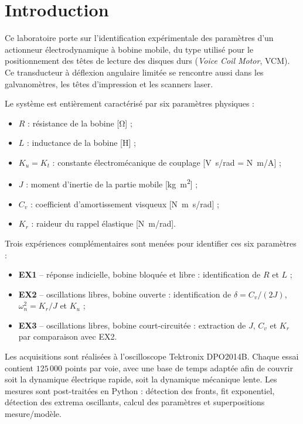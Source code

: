 \section{Introduction}

Ce laboratoire porte sur l'identification expérimentale des paramètres d'un actionneur électrodynamique à bobine mobile, du type utilisé pour le positionnement des têtes de lecture des disques durs (\emph{Voice Coil Motor}, VCM). Ce transducteur à déflexion angulaire limitée se rencontre aussi dans les galvanomètres, les têtes d'impression et les scanners laser.

Le système est entièrement caractérisé par six paramètres physiques :
\begin{itemize}
    \item \(R\) : résistance de la bobine [\si{\ohm}] ;
    \item \(L\) : inductance de la bobine [\si{H}] ;
    \item \(K_u = K_t\) : constante électromécanique de couplage [\si{V.s/rad} = \si{N.m/A}] ;
    \item \(J\) : moment d'inertie de la partie mobile [\si{kg.m^2}] ;
    \item \(C_v\) : coefficient d'amortissement visqueux [\si{N.m.s/rad}] ;
    \item \(K_r\) : raideur du rappel élastique [\si{N.m/rad}].
\end{itemize}

Trois expériences complémentaires sont menées pour identifier ces six paramètres :
\begin{itemize}
    \item \textbf{EX1} -- réponse indicielle, bobine bloquée et libre : identification de \(R\) et \(L\) ;
    \item \textbf{EX2} -- oscillations libres, bobine ouverte : identification de \(\delta = C_v/(2J)\), \(\omega_n^2 = K_r/J\) et \(K_u\) ;
    \item \textbf{EX3} -- oscillations libres, bobine court-circuitée : extraction de \(J\), \(C_v\) et \(K_r\) par comparaison avec EX2.
\end{itemize}

Les acquisitions sont réalisées à l'oscilloscope Tektronix DPO2014B. Chaque essai contient \(125\,000\) points par voie, avec une base de temps adaptée afin de couvrir soit la dynamique électrique rapide, soit la dynamique mécanique lente. Les mesures sont post-traitées en Python : détection des fronts, fit exponentiel, détection des extrema oscillants, calcul des paramètres et superpositions mesure/modèle.

